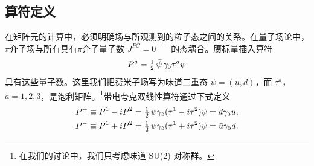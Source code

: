 \subsection{算符定义}
在矩阵元的计算中，必须明确场与所观测到的粒子态之间的关系。在量子场论中，$\pi$介子场与所有具有$\pi$介子量子数 $J^{PC} = 0^{-+}$ 的态耦合。赝标量插入算符
\begin{equation}
P^a = \tfrac{1}{2}\,\bar{\psi}\,\gamma_5\tau^a\psi
\end{equation}
具有这些量子数。这里我们把费米子场写为味道二重态 $\psi = (u, d)$，而 $\tau^a$，$a = 1, 2, 3$，是泡利矩阵。\footnote{在我们的讨论中，我们只考虑味道 SU(2) 对称群。}带电夸克双线性算符通过下式定义
\begin{equation}
\begin{aligned}
P^+ &\equiv P^1 - i P^2 = \tfrac{1}{2}\,\bar{\psi}\gamma_5(\tau^1 - i\tau^2)\psi = \bar{d}\gamma_5 u , \\
P^- &\equiv P^1 + i P^2 = \tfrac{1}{2}\,\bar{\psi}\gamma_5(\tau^1 + i\tau^2)\psi = \bar{u}\gamma_5 d .
\end{aligned}
\end{equation}

